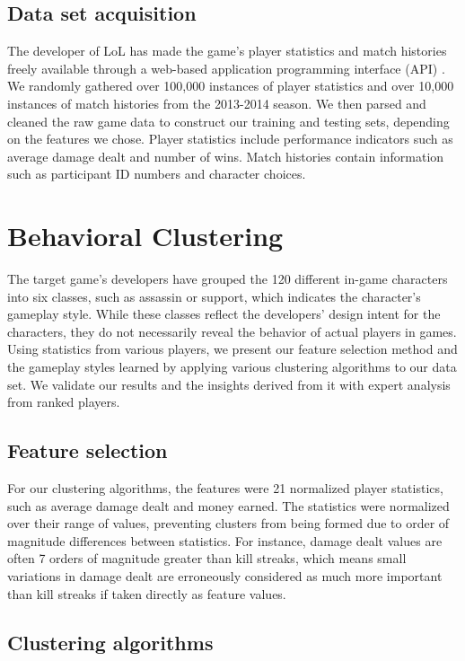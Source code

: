 \documentclass[letterpaper,10 pt,conference]{ieeeconf}
\begin{document}
\subsection{Data set acquisition}

The developer of LoL has made the game's player statistics and match histories freely available through a web-based application programming interface (API) \cite{Rio:14}. We randomly gathered over 100,000 instances of player statistics and over 10,000 instances of match histories from the 2013-2014 season. We then parsed and cleaned the raw game data to construct our training and testing sets, depending on the features we chose. Player statistics include performance indicators such as average damage dealt and number of wins. Match histories contain information such as participant ID numbers and character choices.

\section{Behavioral Clustering}

The target game's developers have grouped the 120 different in-game characters into six classes, such as assassin or support, which indicates the character's gameplay style. While these classes reflect the developers' design intent for the characters, they do not necessarily reveal the behavior of actual players in games. Using statistics from various players, we present our feature selection method and the gameplay styles learned by applying various clustering algorithms to our data set. We validate our results and the insights derived from it with expert analysis from ranked players.

\subsection{Feature selection}

For our clustering algorithms, the features were 21 normalized player statistics, such as average damage dealt and money earned. The statistics were normalized over their range of values, preventing clusters from being formed due to order of magnitude differences between statistics. For instance, damage dealt values are often 7 orders of magnitude greater than kill streaks, which means small variations in damage dealt are erroneously considered as much more important than kill streaks if taken directly as feature values. 

\subsection{Clustering algorithms}
\end{document}
